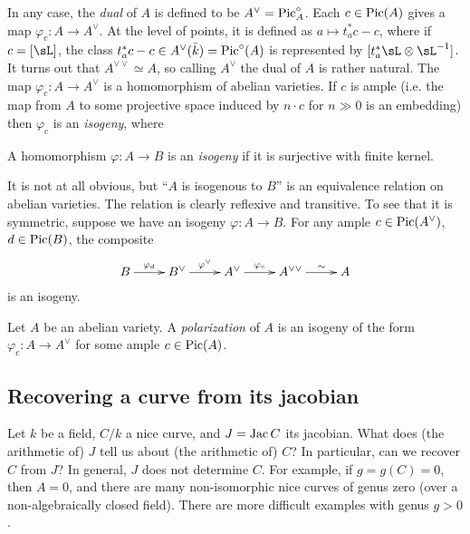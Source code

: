 In any case, the \emph{dual} of $A$ is defined to be $A^\vee = \operatorname{Pic}_A^\circ$. 
Each $c\in \operatorname{Pic}(A)$ gives a map $\varphi_c:A\to A^\vee$. At the level of 
points, it is defined as $a\mapsto t_a^* c - c$, where if $c=[\sL]$, 
the class $t_a^*c - c\in A^\vee(\bar k) = \operatorname{Pic}^\circ(A)$ is represented by 
$[t_a^*\sL\otimes\sL^{-1}]$. 
It turns out that $A^{\vee\vee} \simeq A$, so calling $A^\vee$ the dual of $A$ 
is rather natural. The map $\varphi_c:A\to A^\vee$ is a homomorphism of abelian 
varieties. If $c$ is ample (i.e. the map from $A$ to some projective space 
induced by $n\cdot c$ for $n\gg 0$ is an embedding) then $\varphi_c$ is an 
\emph{isogeny}, where 

\begin{definition}
A homomorphism $\varphi:A\to B$ is an \emph{isogeny} if it is surjective with 
finite kernel.
\end{definition}

It is not at all obvious, but ``$A$ is isogenous to $B$'' is an equivalence 
relation on abelian varieties. The relation is clearly reflexive and 
transitive. To see that it is symmetric, suppose we have an 
isogeny $\varphi:A\to B$. For any ample $c\in \operatorname{Pic}(A^\vee)$, $d\in \operatorname{Pic}(B)$, 
the composite 
\[\xymatrix{
  B \ar[r]^-{\varphi_d} 
    & B^\vee \ar[r]^-{\varphi^\vee} 
    & A^\vee \ar[r]^-{\varphi_c}
    & A^{\vee\vee} \ar[r]^-\sim 
    & A
}\]
is an isogeny. 

\begin{definition}
Let $A$ be an abelian variety. A \emph{polarization} of $A$ is an isogeny 
of the form $\varphi_c:A\to A^\vee$ for some ample $c\in \operatorname{Pic}(A)$.
\end{definition}





\subsection{Recovering a curve from its jacobian}

Let $k$ be a field, $C/k$ a nice curve, and $J=\operatorname{Jac} C$ its jacobian. What does 
(the arithmetic of) $J$ tell us about (the arithmetic of) $C$? In particular, 
can we recover $C$ from $J$? In general, $J$ does not determine $C$. For 
example, if $g=g(C)=0$, then $A=0$, and there are many non-isomorphic nice 
curves of genus zero (over a non-algebraically closed field). There are more 
difficult examples with genus $g>0$. 

